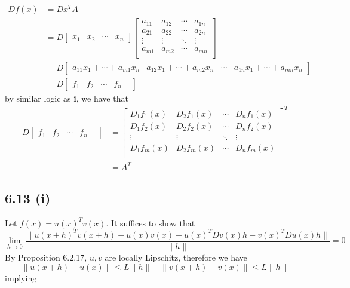 \documentclass[letterpaper,12pt]{article}
\theoremstyle{definition}
\begin{document}
\begin{align*}
    Df(x) &= Dx^TA \\
    &=D
    \begin{bmatrix}
        x_1 & x_2 & \cdots & x_n 
    \end{bmatrix}
    \begin{bmatrix}
        a_{11} & a_{12} & \cdots & a_{1n} \\
        a_{21} & a_{22} & \cdots & a_{2n} \\
        \vdots & \vdots & \ddots & \vdots \\
        a_{m1} & a_{m2} & \cdots & a_{mn} \\
    \end{bmatrix}\\
    &= 
    D\begin{bmatrix}
        a_{11}x_1 + \cdots + a_{m1}x_n &
        a_{12}x_1 + \cdots + a_{m2}x_n &
        \cdots &
        a_{1n}x_1 + \cdots + a_{mn}x_n 
    \end{bmatrix}\\
    &= 
    D\begin{bmatrix}
        f_1 &
        f_2 &
        \cdots &
        f_n &
    \end{bmatrix}
\end{align*}
by similar logic as \textbf{i}, we have that 
\begin{align*}
    D\begin{bmatrix}
        f_1 &
        f_2 &
        \cdots &
        f_n &
    \end{bmatrix}
    &= 
    \begin{bmatrix}
    D_1f_1(x) &D_2f_1(x) & \cdots &D_nf_1(x)  \\
    D_1f_2(x) &D_2f_2(x) & \cdots &D_nf_2(x)  \\
    \vdots & \vdots & \ddots & \vdots \\
    D_1f_m(x) &D_2f_m(x) & \cdots &D_nf_m(x)  \\
    \end{bmatrix}^T\\
    &= A^T
\end{align*}



\subsection*{6.13 (i)}


Let $f(x) = u(x)^Tv(x)$. It suffices to show that
\[ \lim_{h \to 0} \frac{\| u (x+h)^Tv(x+h) - u(x)v(x) - u(x)^TDv(x)h - v(x)^TDu(x)h\|}{\|h\|} = 0\]
By Proposition 6.2.17, $u,v$ are locally Lipschitz, therefore we have
\[\|u(x+h)-u(x)\| \leq L\|h\| \quad \|v(x+h)-v(x)\| \leq L\|h\|\]
implying
\end{document}
